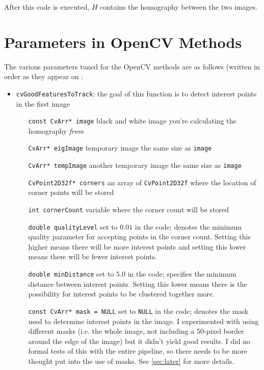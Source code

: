 \documentclass{article}
\begin{document}
After this code is executed, $H$ contains the homography between the two
images. 

\section{Parameters in OpenCV Methods}
\label{apdx:params}

The various parameters tuned for the OpenCV methods are as follows (written in order as they appear on \cite{cvhomogs, points}:

\begin{itemize}

\item \verb|cvGoodFeaturesToTrack|: the goal of this function is to detect
interest points in the first image

\begin{itemize}

\item[\texttt{const CvArr* image}] black and white image you're calculating the
homography \textit{from}

\item[\texttt{CvArr* eigImage}] temporary image the same size as \texttt{image}

\item[\texttt{CvArr* tempImage}] another temporary image the same size as
\texttt{image}

\item[\texttt{CvPoint2D32f* corners}] an array of \texttt{CvPoint2D32f} where
the location of corner points will be stored

\item[\texttt{int cornerCount}] variable where the corner count will be stored

\item[\texttt{double qualityLevel}] set to $0.01$ in the code; denotes the
minimum quality parameter for accepting points in the corner count. Setting
this higher means there will be more interest points and setting this lower
means there will be fewer interest points. 

\item[\texttt{double minDistance}] set to $5.0$ in the code; specifies the
minimum distance between interest points. Setting this lower means there is
the possibility for interest points to be clustered together more.

\item[\texttt{const CvArr* mask = NULL}] set to \texttt{NULL} in the code;
denotes the mask used to determine interest points in the image. I experimented
with using different masks (i.e. the whole image, not including a 50-pixel
border around the edge of the image) but it didn't yield good results. I did no
formal tests of this with the entire pipeline, so there needs to be more
thought put into the use of masks. See \ref{sec:later} for more details.    


\end{itemize}
\end{itemize}
\end{document}
